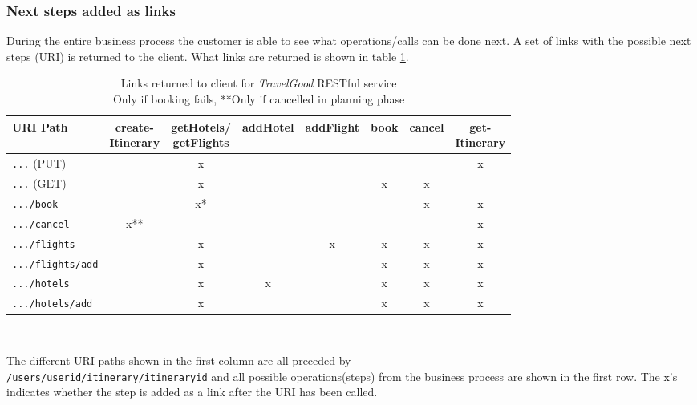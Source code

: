 \subsubsection*{Next steps added as links}
During the entire business process the customer is able to see what operations/calls can be done next. A set of links with the possible next steps (URI) is returned to the client. What links are returned is shown in table \ref{tableLinks}. 

\begin{table}[H]
\begin{adjustwidth}{-1cm}{-1cm}
\centering
\begin{tabular}{|l|c|c|c|c|c|c|c|} \hline
URI Path & \shortstack{create- \\ Itinerary} & \shortstack{getHotels/ \\ getFlights} & addHotel & addFlight & book & cancel & \shortstack{get- \\ Itinerary}\\ \hline
\texttt{...} (PUT) 			&	&x	&	&	&	&	&x\\ \hline
\texttt{...} (GET) 			&	&x	&	&	&x	&x	&\\ \hline
\texttt{.../book} 			&	&x*	&	&	&	&x	&x\\ \hline
\texttt{.../cancel} 		&x**&	&	&	&	&	&x\\ \hline
\texttt{.../flights}		&	&x	&	&x	&x	&x	&x\\ \hline
\texttt{.../flights/add} 	&	&x	&	&	&x	&x	&x\\ \hline
\texttt{.../hotels }		&	&x	&x	&	&x	&x	&x\\ \hline
\texttt{.../hotels/add} 	&	&x	&	&	&x	&x	&x\\ \hline
\end{tabular}\\
\captionsetup{justification=centering}
\caption{Links returned to client for \textit{TravelGood} RESTful service \\ \footnotesize *Only if booking fails, **Only if cancelled in planning phase}
\label{tableLinks}
\end{adjustwidth}
\end{table}

The different URI paths shown in the first column are all preceded by\\ \texttt{/users/{userid}/itinerary/{itineraryid}} and all possible operations(steps) from the business process are shown in the first row. 
The x’s indicates whether the step is added as a link after the URI has been called. 

